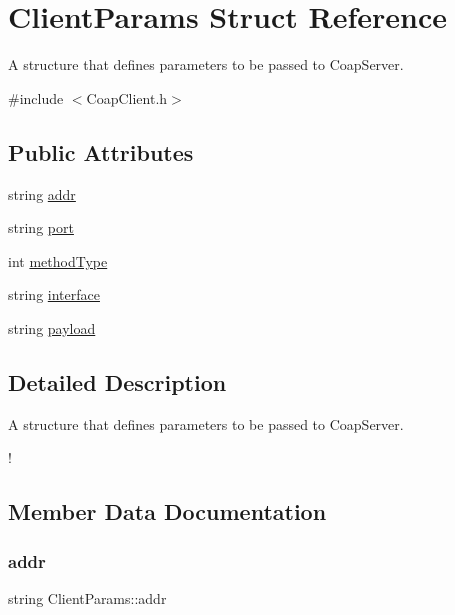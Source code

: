 \hypertarget{structClientParams}{}\section{Client\+Params Struct Reference}
\label{structClientParams}


A structure that defines parameters to be passed to Coap\+Server.  




{\ttfamily \#include $<$Coap\+Client.\+h$>$}

\subsection*{Public Attributes}
\begin{DoxyCompactItemize}
\item 
string \hyperlink{structClientParams_a3277dd9bc0fa8283a7d3b82d53f3c16a}{addr}
\item 
string \hyperlink{structClientParams_ade2b9a6084d6b1989c3440fe2cd60fdb}{port}
\item 
int \hyperlink{structClientParams_aa40f37f1eeb3ed6cff8a76e92a7e9bd1}{method\+Type}
\item 
string \hyperlink{structClientParams_a6af6f3817ebf9ed3f7d9378e6a23a59e}{interface}
\item 
string \hyperlink{structClientParams_aa16d76f3cbdfa5bfd4e54bcdb9a25737}{payload}
\end{DoxyCompactItemize}


\subsection{Detailed Description}
A structure that defines parameters to be passed to Coap\+Server. 

! 

\subsection{Member Data Documentation}
\mbox{\label{structClientParams_a3277dd9bc0fa8283a7d3b82d53f3c16a}} 
\subsubsection{\texorpdfstring{addr}{addr}}
{\footnotesize\ttfamily string Client\+Params\+::addr}


